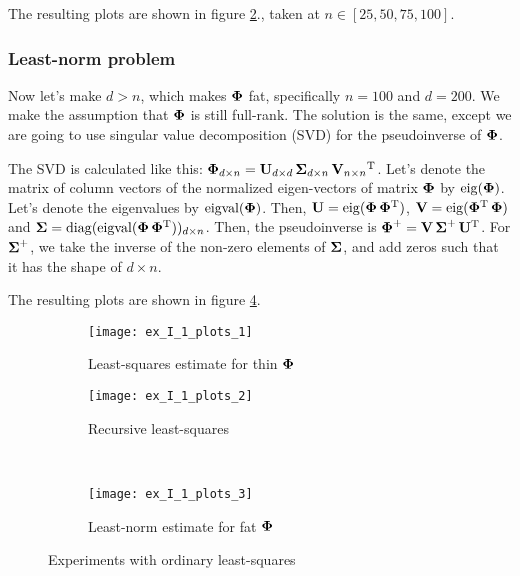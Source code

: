 The resulting plots are shown in figure \ref{fig:ex_I_1_plots_2}.,
taken at $n\in[25, 50, 75, 100]$.

\subsubsection*{Least-norm problem}

Now let's make $d>n$, which makes $\boldsymbol{\mathrm{\Phi}}$ fat, specifically $n=100$ and $d=200$.
We make the assumption that $\boldsymbol{\mathrm{\Phi}}$ is still full-rank.
The solution is the same, except we are going to use singular value decomposition (SVD)
for the pseudoinverse of $\boldsymbol{\mathrm{\Phi}}$.

The SVD is calculated like this: $\boldsymbol{\mathrm{\Phi}}_{d\times n}=\boldsymbol{\mathrm{U}}_{d\times d}\,\boldsymbol{\mathrm{\Sigma}}_{d\times n}\,\boldsymbol{\mathrm{V}}_{n\times n}\textsuperscript{T}$. Let's denote the matrix of column vectors of the normalized eigen-vectors 
of matrix $\boldsymbol{\mathrm{\Phi}}$ by $\operatorname{eig}(\boldsymbol{\mathrm{\Phi}})$. Let's denote the eigenvalues by $\operatorname{eigval}(\boldsymbol{\mathrm{\Phi}})$.
Then, $\boldsymbol{\mathrm{U}} = \operatorname{eig}(\boldsymbol{\mathrm{\Phi}}\,\boldsymbol{\mathrm{\Phi}}\textsuperscript{T})$, $\boldsymbol{\mathrm{V}} = \operatorname{eig}(\boldsymbol{\mathrm{\Phi}}\textsuperscript{T}\,\boldsymbol{\mathrm{\Phi}})$ and
$\boldsymbol{\mathrm{\Sigma}} = \operatorname{diag}(\operatorname{eigval}(\boldsymbol{\mathrm{\Phi}}\,\boldsymbol{\mathrm{\Phi}}\textsuperscript{T}))_{d\times n}$.
Then, the pseudoinverse is $\boldsymbol{\mathrm{\Phi}}^+=\boldsymbol{\mathrm{V}}\,\boldsymbol{\mathrm{\Sigma}}^+\,\boldsymbol{\mathrm{U}}\textsuperscript{T}$.
For $\boldsymbol{\mathrm{\Sigma}}^+$, we take the inverse of the non-zero elements of $\boldsymbol{\mathrm{\Sigma}}$, and add
zeros such that it has the shape of $d\times n$.

The resulting plots are shown in figure \ref{fig:ex_I_1_plots_3}.

\begin{figure}[h]
	\centering
	\begin{subfigure}[b]{.45\textwidth}
		\centering
		\texttt{[image: ex\_I\_1\_plots\_1]}
		\caption{Least-squares estimate for thin $\boldsymbol{\mathrm{\Phi}}$}
		\label{fig:ex_I_1_plots_1}
	\end{subfigure}\hfill
	\begin{subfigure}[b]{.45\textwidth}
		\centering
		\texttt{[image: ex\_I\_1\_plots\_2]}
		\caption{Recursive least-squares}
		\label{fig:ex_I_1_plots_2}
	\end{subfigure}\\
	\begin{subfigure}[b]{.45\textwidth}
		\centering
		\texttt{[image: ex\_I\_1\_plots\_3]}
		\caption{Least-norm estimate for fat $\boldsymbol{\mathrm{\Phi}}$}
		\label{fig:ex_I_1_plots_3}
	\end{subfigure}
	\caption{Experiments with ordinary least-squares}
\end{figure}


